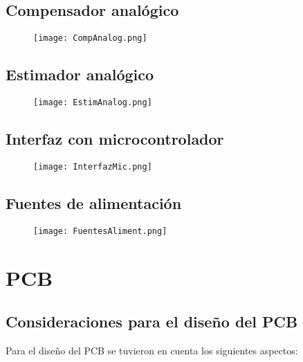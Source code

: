 \subsection{Compensador analógico}
\begin{figure}[H]
	\centering
	\texttt{[image: CompAnalog.png]}
	\label{fig:CompAnalog}
\end{figure}

\subsection{Estimador analógico}
\begin{figure}[H]
	\centering
	\texttt{[image: EstimAnalog.png]}
	\label{fig:EstimAnalog}
\end{figure}

\subsection{Interfaz con microcontrolador}
\begin{figure}[H]
	\centering
	\texttt{[image: InterfazMic.png]}
	\label{fig:InterfazMic}
\end{figure}

\subsection{Fuentes de alimentación}
\begin{figure}[H]
	\centering
	\texttt{[image: FuentesAliment.png]}
	\label{fig:FuentesAliment}
\end{figure}

\section{PCB}
\subsection{Consideraciones para el diseño del PCB}
Para el diseño del PCB se tuvieron en cuenta los siguientes aspectos:

